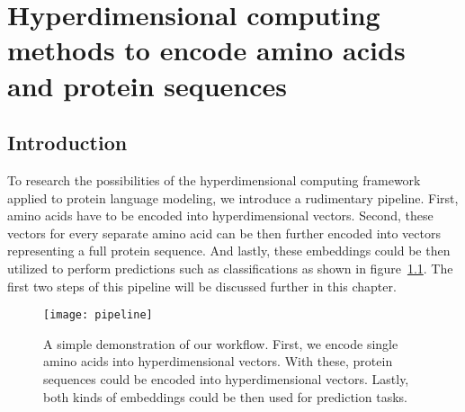 \chapter[Amino acid and protein encoding]{Hyperdimensional computing methods to encode amino acids and protein sequences}
\section{Introduction}
To research the possibilities of the hyperdimensional computing framework applied to protein language modeling, we introduce a rudimentary pipeline. First, amino acids have to be encoded into hyperdimensional vectors. Second, these vectors for every separate amino acid can be then further encoded into vectors representing a full protein sequence. And lastly, these embeddings could be then utilized to perform predictions such as classifications as shown in figure~\ref{fig:pipeline}. The first two steps of this pipeline will be discussed further in this chapter.

\begin{figure}[H]
    \centering
    \texttt{[image: pipeline]}
    \caption{A simple demonstration of our workflow. First, we encode single amino acids into hyperdimensional vectors. With these, protein sequences could be encoded into hyperdimensional vectors. Lastly, both kinds of embeddings could be then used for prediction tasks.}\label{fig:pipeline}
\end{figure}

